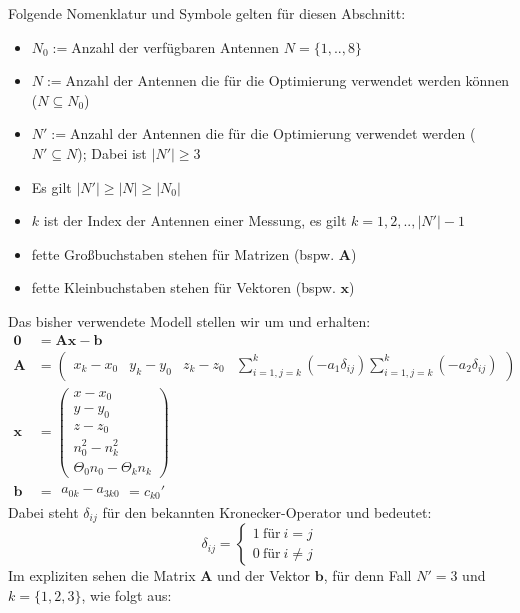 {
\small
Folgende Nomenklatur und Symbole gelten für diesen Abschnitt:
\begin{itemize}[itemsep=0mm]
	\item	$N_0:=$Anzahl der verfügbaren Antennen $N=\{1,..,8\}$
	\item	$N:=$Anzahl der Antennen die für die Optimierung verwendet werden können ($N \subseteq N_0$)    
	\item	$N':=$Anzahl der Antennen die für die Optimierung verwendet werden ($N' \subseteq N$); Dabei ist $|N'| \geq 3$
	\item	Es gilt $|N'| \geq |N| \geq |N_0|$   
	\item	$k$ ist der Index der Antennen einer Messung, es gilt $k = 1,2,..,|N'|-1$
	\item	fette Großbuchstaben stehen für Matrizen (bspw. $\mathbf{A}$)
	\item	fette Kleinbuchstaben stehen für Vektoren (bspw. $\mathbf{x}$)
\end{itemize}
%
Das bisher verwendete Modell stellen wir um und erhalten:
\begin{align}
%
\mathbf{0}&=\mathbf{A}\mathbf{x}-\mathbf{b}\\
\mathbf{A}&=
\left(
	\begin{array}{ccccc}
		x_k-x_0 & y_k-y_0 & z_k-z_0 & \sum_{i=1,j=k}^{k}(-a_1\delta_{ij}) \sum_{i=1,j=k}^{k}(-a_2\delta_{ij})
	\end{array}
\right)\nonumber\\
%
\mathbf{x}&=
\left(
   \begin{array}{c}
	   x-x_0\\
	   y-y_0\\
	   z-z_0\\
	   n_0^2-n_k^2\\
	   \Theta_0n_0-\Theta_kn_k
   \end{array}
\right)\nonumber\\
%
\mathbf{b}&=
	\begin{array}{c}
		a_{0k}-a_{3k0} 
	\end{array}
	= c_{k0}'\nonumber
\end{align}
%
Dabei steht $\delta_{ij}$ für den bekannten Kronecker-Operator und bedeutet:
\begin{equation*}
\delta_{ij} = \begin{cases}1 ~\text{für}~ i=j\\ 0 ~\text{für}~ i\neq j\end{cases}
\end{equation*}
%
Im expliziten sehen die Matrix $\mathbf{A}$ und der Vektor $\mathbf{b}$, für denn Fall $N'=3$ und $k=\{1,2,3\}$, wie folgt aus:
}
